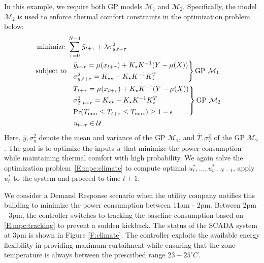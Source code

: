In this example, we require both GP models \(\mathcal{M}_1\) and \(\mathcal{M}_2\).
Specifically, the model \(\mathcal{M}_2\) is used to enforce thermal comfort constraints in the optimization problem below:
\begin{align}
&\operatorname*{minimize} \ \sum_{\tau=0}^{N-1} \bar{y}_{t+\tau} + \lambda \sigma^2_{y,t+\tau} \label{E:mpc:climate} \\
& 
\begin{aligned}
\text{subject to}\ \  & \begin{rcases}\bar{y}_{t+\tau} = \mu(x_{t+\tau}) + K_\star K^{-1} (Y - \mu(X)) \nonumber\\
\sigma^2_{y,t+\tau} = K_{\star \star} - K_\star K^{-1} K_\star^T
\end{rcases} \text{GP } \mathcal{M}_1 \\
& \begin{rcases}
 \bar{T}_{t+\tau} = \mu(x_{t+\tau}) + K_\star K^{-1} (Y - \mu(X)) \nonumber\\
\sigma^2_{T,t+\tau} = K_{\star \star} - K_\star K^{-1} K_\star^T \\
\Pr(T_{\mathrm{min}} \leq T_{t+\tau} \leq T_{\mathrm{max}}) \geq 1 - \epsilon \nonumber
\end{rcases} \text{GP } \mathcal{M}_2 \\
& \ u_{t+\tau} \in \mathcal{U} \nonumber
\end{aligned}
\end{align}
Here, \(\bar{y},\sigma^2_{y}\) denote the mean and variance of the GP \(\mathcal{M}_1\), and \(\bar{T},\sigma^2_{T}\) of the GP \(\mathcal{M}_2\). 
The goal is to optimize the inputs \(u\) that minimize the power consumption while maintaining thermal comfort with high probability. 
We again solve the optimization problem~\eqref{E:mpc:climate} to compute optimal \(u_{t}^*, \dots, u_{t+N-1}^*\), apply \(u_{t}^*\) to the system and proceed to time \(t+1\).

We consider a Demand Response scenario when the utility company notifies this building to minimize the power consumption between 11am - 2pm.
Between 2pm - 3pm, the controller switches to tracking the baseline consumption based on \eqref{E:mpc:tracking} to prevent a sudden kickback.
The status of the SCADA system at 3pm is shown in Figure \ref{F:climate}.
The controller exploits the available energy flexibility in providing maximum curtailment while ensuring that the zone temperature is always between the prescribed range \(23-25^\circ C\).



